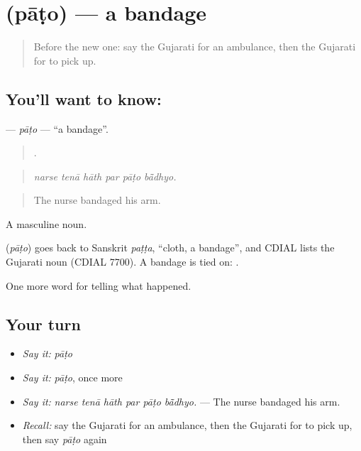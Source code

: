 \section[\texorpdfstring{\gu{પાટો} (pāṭo)}{પાટો (pāṭo)}]{ (pāṭo) — a bandage}

\label{lesson:GU-C296-pato}



\begin{quote}
Before the new one: say the Gujarati for an ambulance, then the Gujarati for to pick up.
\end{quote}

\subsection*{You'll want to know: }
\textbf{} — \emph{pāṭo} — \textquotedblleft{}a bandage\textquotedblright{}.

\begin{quote}
     .
\end{quote}

\begin{quote}
\emph{narse tenā hāth par pāṭo bā̃dhyo.}
\end{quote}

\begin{quote}
The nurse bandaged his arm.
\end{quote}

A masculine noun.

\begin{cousinweb}
\textbf{} (\emph{pāṭo}) goes back to Sanskrit \emph{paṭṭa}, \textquotedblleft{}cloth, a bandage\textquotedblright{}, and CDIAL lists the Gujarati noun (CDIAL 7700). A bandage is tied on: \textbf{ }.
\end{cousinweb}

\begin{grammarlens}[title={What you've built}]
One more word for telling what happened.
\end{grammarlens}

\subsection*{Your turn}
\begin{itemize}
\raggedright
  \item \emph{Say it:} \emph{pāṭo}
  \item \emph{Say it:} \emph{pāṭo}, once more
  \item \emph{Say it:} \emph{narse tenā hāth par pāṭo bā̃dhyo.} — The nurse bandaged his arm.
  \item \emph{Recall:} say the Gujarati for an ambulance, then the Gujarati for to pick up, then say \emph{pāṭo} again
\end{itemize}

